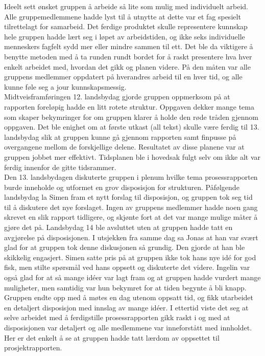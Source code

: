 Ideelt sett ønsket gruppen å arbeide så lite som mulig med individuelt arbeid.
Alle gruppemedlemmene hadde lyst til å utnytte at dette var et fag spesielt tilrettelagt for samarbeid.
Det ferdige produktet skulle representere kunnskap hele gruppen hadde lært seg i løpet av arbeidstiden, og ikke seks individuelle menneskers fagfelt sydd mer eller mindre sammen til ett.
Det ble da viktigere å benytte metoden med å ta runden rundt bordet for å raskt presentere hva hver enkelt arbeidet med, hvordan det gikk og planen videre.
På den måten var alle gruppens medlemmer oppdatert på hverandres arbeid til en hver tid, og alle kunne føle seg a jour kunnskapsmessig.
\\
Midtveisframføringen 12. landsbydag gjorde gruppen oppmerksom på at rapporten foreløpig hadde en litt rotete struktur.
Oppgaven dekker mange tema som skaper bekymringer for om gruppen klarer å holde den røde tråden gjennom oppgaven.
Det ble enighet om at første utkast (all tekst) skulle være ferdig til 13. landsbydag slik at gruppen kunne gå gjennom rapporten samt finpusse på overgangene mellom de forskjellige delene.
Resultatet av disse planene var at gruppen jobbet mer effektivt.
Tidsplanen ble i hovedsak fulgt selv om ikke alt var ferdig innenfor de gitte tidsrammer. 
\\
Den 13. landsbydagen diskuterte gruppen i plenum hvilke tema prosessrapporten burde inneholde og utformet en grov disposisjon for strukturen.
Påfølgende landsbydag la Simen fram et nytt forslag til disposisjon, og gruppen tok seg tid til å diskutere det nye forslaget.
Ingen av gruppens medlemmer hadde noen gang skrevet en slik rapport tidligere, og skjønte fort at det var mange mulige måter å gjøre det på.
Landsbydag 14 ble avsluttet uten at gruppen hadde tatt en avgjørelse på disposisjonen.
I utsjekken fra samme dag sa Jonas at han var svært glad for at gruppen tok denne diskusjonen så grundig.
Den gjorde at han ble skikkelig engasjert.
Simen satte pris på at gruppen ikke tok hans nye id\'{e} for god fisk, men stilte spørsmål ved hans oppsett og diskuterte det videre.
Ingelin var også glad for at så mange id\'{e}er var lagt fram og at gruppen hadde vurdert mange muligheter, men samtidig var hun bekymret for at tiden begynte å bli knapp.
Gruppen endte opp med å møtes en dag utenom oppsatt tid, og fikk utarbeidet en detaljert disposisjon med innslag av mange id\'{e}er.
I ettertid viste det seg at selve arbeidet med å ferdigstille prosessrapporten gikk raskt i og med at disposisjonen var detaljert og alle medlemmene var inneforstått med innholdet.
Her er det enkelt å se at gruppen hadde tatt lærdom av oppsettet til prosjektrapporten.
